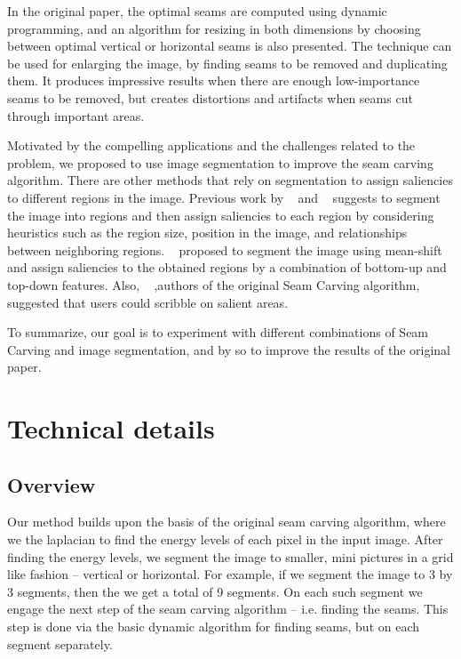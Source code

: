 \documentclass[conference]{acmsiggraph}
\begin{document}
In the original paper, the optimal seams are computed using dynamic programming, and an algorithm for resizing in both dimensions by choosing between optimal vertical or horizontal seams is also presented. The technique can be used for enlarging the image, by finding seams to be removed and duplicating them. It produces impressive results when there are enough low-importance seams to be removed, but creates distortions and artifacts when seams cut through important areas.

Motivated by the compelling applications and the challenges related to the problem, we proposed to use image segmentation to improve the seam carving algorithm. There are other methods that rely on segmentation to assign saliencies to different regions in the image. Previous work by ~\cite{Liu2007} and ~\cite{Hasan2009} suggests to segment the image into regions and then assign saliencies to each region by considering heuristics such as the region size, position in the image, and relationships between neighboring regions. ~\cite{Setlur2005} proposed to segment the image using mean-shift and assign saliencies to the obtained regions by a combination of bottom-up and top-down features. Also, ~\cite{Avidan2007} ,authors of the original Seam Carving algorithm, suggested that users could scribble on salient areas. 

To summarize, our goal is to experiment with different combinations of Seam Carving and image segmentation, and by so to improve the results of the original paper.


\section{Technical details}

\subsection{Overview}

Our method builds upon the basis of the original seam carving algorithm, where we the laplacian to find the energy levels of each pixel in the input image. After finding the energy levels, we segment the image to smaller, mini pictures in a grid like fashion -- vertical or horizontal. For example, if we segment the image to 3 by 3 segments, then the we get a total of 9 segments. On each such segment we engage the next step of the seam carving algorithm -- i.e. finding the seams. This step is done via the basic dynamic algorithm for finding seams, but on each segment separately.
\end{document}
